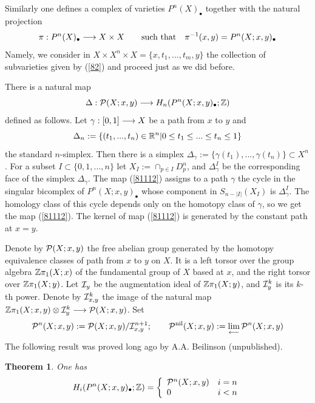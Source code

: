\documentclass[10pt]{article}
\newtheorem{theorem}{Theorem}[section]
\begin{document}
Similarly one defines a complex of varieties $P^n(X)_{\bullet}$ 
together with the natural projection
\begin{equation} \label{2.16.01.6}
\pi: P^n(X)_{\bullet} \longrightarrow X \times X\qquad \mbox{such that} \quad \pi^{-1}(x,y) = 
P^n(X; x,y)_{\bullet}
\end{equation}
Namely, we consider in $X \times X^n \times X = \{x, t_1, ..., t_m, y\}$ the collection of 
subvarieties given by (\ref{82}) and proceed just as we did before. 


There is a natural map 
\begin{equation} \label{81112}
\Delta: {\cal P}(X;x,y) \longrightarrow H_n(P^n(X; x,y)_{\bullet}; {\mathbb Z})
\end{equation}
defined as follows. Let $\gamma:[0,1] \longrightarrow X$ be a path  from  $x$ to $y$ and 
$$
\Delta_n:= \{(t_1, ..., t_n) \in {\mathbb R}^n| 0 \leq t_1 \leq ... \leq t_n \leq 1\}
$$
 the standard $n$-simplex. Then there is a simplex $
\Delta_{\gamma} := \{\gamma(t_{1}),... , \gamma(t_{n})\} \subset X^n$. 
 For a subset $I \subset \{0, 1, ..., n\}$ let $X_I:= \cap_{p \in I} D^n_p$,  
and $\Delta^I_{\gamma}$ be the corresponding face of the simplex $\Delta_{\gamma}$. 
 The map (\ref{81112})  
assigns to a path $\gamma$ the  cycle  in the singular
bicomplex  of $P^n(X; x,y)_{\bullet}$ whose component in $S_{n-|I|}(X_I)$ is 
 $\Delta^I_{\gamma}$. 
The homology class of this cycle depends only 
on the homotopy class of $\gamma$, so we get the map (\ref{81112}). 
The kernel of  map (\ref{81112})
is  generated by the  
constant path at $x=y$.  

  Denote by ${\cal P}(X; x,y)$ the free abelian group 
generated by the homotopy 
equivalence classes of path from $x$ to $y$ on $X$. It is a left torsor over the 
group algebra ${\mathbb Z}\pi_1(X; x)$ of the fundamental group of $X$ based at $x$, and the right 
torsor over ${\mathbb Z}\pi_1(X; y)$. 
Let ${\cal I}_y$ be the augmentation ideal of ${\mathbb Z}\pi_1(X; y)$, and  ${\cal I}_y^k$ 
is its $k$-th power. 
Denote by ${\cal I}_{x,y}^k$ the image of the natural map
$ {\mathbb Z}\pi_1(X; x,y) \otimes {\cal I}_y^k \longrightarrow {\cal P}(X; x,y)$. Set
$$
{\cal P}^n(X; x,y):= {\cal P}(X; x,y)/ {\cal I}_{x,y}^{n+1}; \qquad {\cal P}^{\rm nil}(X; x,y):=
\lim_{\longleftarrow}{\cal P}^n(X; x,y)
$$
The following result was proved long ago by A.A. Beilinson (unpublished).

\begin{theorem} \label{2.2.01.1} One has 
\begin{equation} \label{2.8.01.1}
H_i(P^n(X; x,y)_{\bullet}; {\mathbb Z}) = \left\{ \begin{array}{ll}
{\cal P}^{n}(X; x,y) & i=n\\ 
0 & i< n \end{array}\right.
\end{equation}
\end{theorem}
\end{document}
